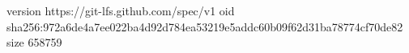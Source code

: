 version https://git-lfs.github.com/spec/v1
oid sha256:972a6de4a7ee022ba4d92d784ea53219e5addc60b09f62d31ba78774cf70de82
size 658759
